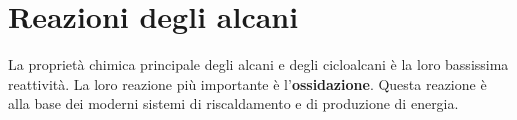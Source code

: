 \section{Reazioni degli alcani}
La proprietà chimica principale degli alcani e degli cicloalcani è la loro bassissima reattività. La loro reazione più importante è l'\textbf{ossidazione}. Questa reazione è alla base dei moderni sistemi di riscaldamento e di produzione di energia.

\begin{reaction*}
	 \qquad {}
\end{reaction*}
\begin{reaction*}
	 \qquad {}
\end{reaction*}
